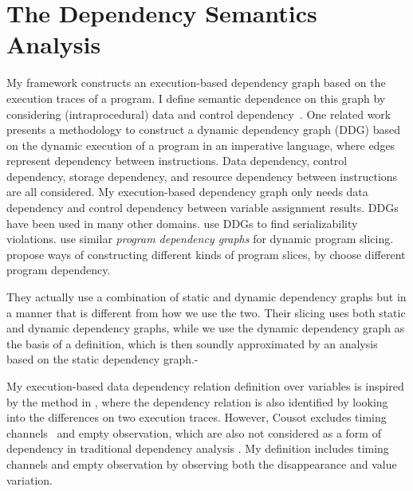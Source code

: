 \section{The Dependency Semantics Analysis}
\label{sec:relatedwork-adapt-semantics}
My framework constructs an execution-based dependency graph based on the execution traces of a program. 
    I define semantic dependence on this graph by considering (intraprocedural) data and control 
    dependency~\cite{bilardi1996framework,cytron1991efficiently,pollock1989incremental}.    
    One related work  
    \cite{austin1992dynamic} presents a methodology to construct a dynamic dependency graph (DDG) based on the dynamic execution of a program in an imperative language, where edges represent dependency between instructions. Data dependency, control dependency, storage dependency, and resource dependency between instructions are all considered. My execution-based dependency graph only needs data dependency and control dependency between variable assignment results. 
    DDGs have been used in many other domains. \cite{nagar2018automated} use DDGs to find serializability violations. \cite{hammer2006dynamic} use similar \emph{program dependency graphs} \cite{ferrante1987program} for dynamic program slicing.
    \cite{mastroeni2008data} propose ways of constructing different kinds of program slices, by choose different program dependency. 

    They actually use a combination of  
    static and dynamic dependency graphs but in a manner that is different from how we use the two. Their slicing uses both static and dynamic dependency graphs, while we use the dynamic dependency graph as the basis of a definition, which is then soundly approximated by an analysis based on the static dependency graph.-
    
    My execution-based data dependency relation definition over variables 
    is inspired by the method in \cite{Cousot19a}, where the dependency relation is also identified by looking into the differences on two execution traces. 
    However, Cousot excludes timing channels~\cite{SabelfeldM03} and empty observation, which are also not considered as a form of dependency in traditional dependency analysis \cite{DenningD77}.
    My definition includes timing channels and empty observation by observing both the disappearance and value variation.
  

